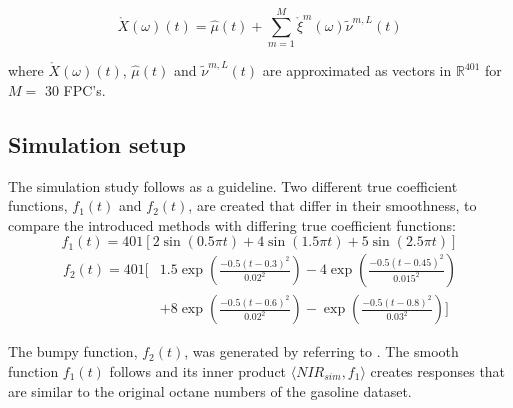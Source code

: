 \documentclass[11pt,twoside,a4paper]{article}
\begin{document}
	
	\begin{equation}
		\mathring{X}(\omega)(t) = \hat{\mu}(t) + \sum_{m = 1}^{M} \mathring{\xi}^m(\omega) \tilde{\nu}^{m,L}(t)
	\end{equation}
	
	where $\mathring{X}(\omega)(t)$, $\hat{\mu}(t)$ and $\tilde{\nu}^{m,L}(t)$  are approximated as vectors in $\mathbb{R}^{401}$ for $M =$ 30 FPC's.
    
    \subsection{Simulation setup}
	The simulation study follows \cite{Reiss_2007b} as a guideline. Two different true coefficient functions,  $f_1(t)$ and  $f_2(t)$, are created that differ in their smoothness, to compare the introduced methods with differing true coefficient functions:
	\begin{equation}
    	f_1(t) = 401 \left[ 2\sin(0.5\pi t) + 4\sin(1.5 \pi t) + 5\sin(2.5 \pi t) \right]
    \end{equation}
    \begin{equation}
    	\begin{split}
    		f_2(t) = 401  \Bigg[ & 1.5 \exp{\left(\frac{-0.5(t-0.3)^2}{0.02^2}\right)} - 4 \exp{\left(\frac{-0.5(t-0.45)^2}{0.015^2}\right)} \\
    				 & + 8 \exp{\left(\frac{-0.5(t-0.6)^2}{0.02^2}\right)} -  \exp{\left(\frac{-0.5(t-0.8)^2}{0.03^2}\right)} \Bigg]
    	\end{split}
    \end{equation}
    
    The bumpy function, $f_2(t)$, was generated by referring to \cite{cardot_bumpyfunction_2002}. The smooth function $f_1(t)$ follows \cite{Reiss_2007b} and its inner product $\langle NIR_{sim}, f_1 \rangle$ creates responses that are similar to the original octane numbers of the gasoline dataset. 
\end{document}
